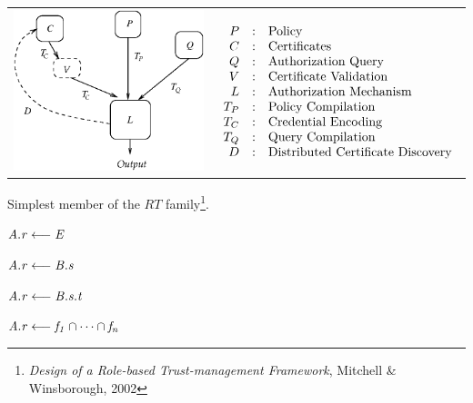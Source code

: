 \begin{tabular}{cc}
\includegraphics{tmstruct.eps}
& 
\hspace{-10mm}
$
\begin{array}[b]{rcl}
P &:& \text{Policy}\\
C &:& \text{Certificates}\\
Q &:& \text{Authorization Query}\\
V &:& \text{Certificate Validation}\\
L &:& \text{Authorization Mechanism}\\
T_P &:& \text{Policy Compilation}\\
T_C &:& \text{Credential Encoding}\\
T_Q &:& \text{Query Compilation}\\
D &:& \text{Distributed Certificate Discovery}\\
\end{array}
$
\end{tabular}
\stopslide


Simplest member of the $RT$ family\footnote{\textit{Design of a Role-based Trust-management
    Framework}, Mitchell \& Winsborough, 2002}.
\begin{cenumerate}
\item $\mathit{A.r} \stackrel{}{\longleftarrow} \mathit{E}$ 
\item $\mathit{A.r} \stackrel{}{\longleftarrow} \mathit{B.s}$ 
\item $\mathit{A.r} \stackrel{}{\longleftarrow} \mathit{B.s.t}$ 
\item $\mathit{A.r} \stackrel{}{\longleftarrow} \mathit{f_1 \cap \cdots \cap f_n}$
\end{cenumerate}
\stopslide


